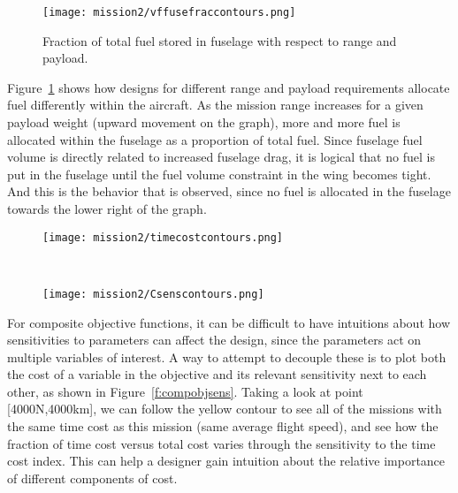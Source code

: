 \begin{figure}
    \centering
    \texttt{[image: mission2/vffusefraccontours.png]}
    \caption{Fraction of total fuel stored in fuselage with respect to range and payload.}
    \label{f:fusefuelfrac}
\end{figure}

Figure~\ref{f:fusefuelfrac} shows how designs for different range and payload requirements
allocate fuel differently within the aircraft. As the mission range increases for a given payload weight
(upward movement on the graph),
more and more fuel is allocated within the fuselage as a proportion of total fuel. Since fuselage fuel
volume is directly related to increased fuselage drag, it is logical that no fuel is put in the fuselage
until the fuel volume constraint in the wing becomes tight. And this is the behavior that is observed,
since no fuel is allocated in the fuselage towards the lower right of the graph.

\begin{figure*}[t!]
    \centering
    \begin{subfigure}[t]{0.5\linewidth}
        \centering
        \texttt{[image: mission2/timecostcontours.png]}
    \end{subfigure}%
    ~
    \begin{subfigure}[t]{0.5\linewidth}
        \centering
        \texttt{[image: mission2/Csenscontours.png]}
    \end{subfigure}
    \caption[Time cost and time cost index sensitivity contours.]{Time cost and time cost index sensitivity contours.
    We can gain intuition about the relative importance of different components
    of composite objective functions by showing both the costs and their sensitivities together.}
    \label{f:compobjsens}
\end{figure*}

For composite objective functions, it can be difficult to have intuitions about how sensitivities
to parameters can affect the design, since the parameters act on multiple variables of interest. A way
to attempt to decouple these is to plot both the cost of a variable in the objective and its relevant
sensitivity next to each other, as shown in Figure~\ref{f:compobjsens}. Taking a look at point [4000N,4000km],
we can follow the yellow contour to see all of the missions with the same time cost as this mission
(same average flight speed),
and see how the fraction of time cost versus total cost varies through the sensitivity to the time cost index.
This can help a designer gain intuition about the relative importance of different components of cost.

